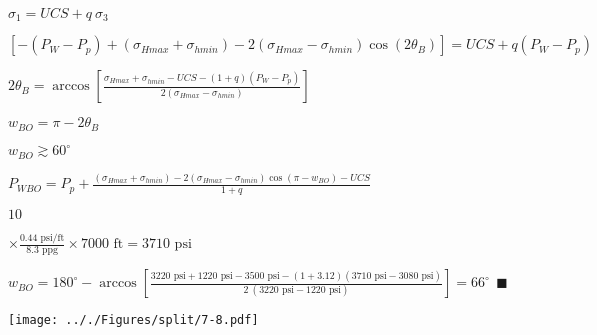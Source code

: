\documentclass[onecolumn,11pt]{report}
\def\lthtmlcheckvsize{\ifdim\ht\sizebox<\vsize 
  \ifdim\wd\sizebox<\hsize\expandafter\hfill\fi \expandafter\vfill
  \else\expandafter\vss\fi}%
\begin{document}
{\newpage\clearpage
{}%
$ \sigma_1 = UCS + q \: \sigma_3$%
\lthtmlindisplaymathZ
\lthtmlcheckvsize\clearpage}

{\newpage\clearpage
{}%
$\displaystyle \left[ -(P_W - P_p) + (\sigma_{Hmax} + \sigma_{hmin})
- 2(\sigma_{Hmax} - \sigma_{hmin}) \cos (2 \theta_B) \right]
= UCS + q (P_W - P_p)$%
\lthtmlindisplaymathZ
\lthtmlcheckvsize\clearpage}

{\newpage\clearpage
{}%
$\displaystyle 2 \theta_B = \arccos \left[ \frac{ \sigma_{Hmax} + \sigma_{hmin} - UCS - (1+q)(P_W - P_p)}{2(\sigma_{Hmax} - \sigma_{hmin})} \right]$%
\lthtmlindisplaymathZ
\lthtmlcheckvsize\clearpage}

{\newpage\clearpage
{}%
$\displaystyle w_{BO} = \pi - 2 \theta_B$%
\lthtmlindisplaymathZ
\lthtmlcheckvsize\clearpage}

{\newpage\clearpage
{}%
$ w_{BO} \gtrsim 60^{\circ}$%
\lthtmlindisplaymathZ
\lthtmlcheckvsize\clearpage}

{\newpage\clearpage
{}%
$\displaystyle P_{WBO} = P_p + \frac{ (\sigma_{Hmax} + \sigma_{hmin})
- 2(\sigma_{Hmax} - \sigma_{hmin}) \cos (\pi - w_{BO}) - UCS}{1+q}$%
\lthtmlindisplaymathZ
\lthtmlcheckvsize\clearpage}

{\newpage\clearpage
{}%
$\displaystyle 10$%
\lthtmlindisplaymathZ
\lthtmlcheckvsize\clearpage}

{\newpage\clearpage
{}%
$\displaystyle \times
\frac{0.44 \text{ psi/ft}} {8.3 \text{ ppg}} \times
7000 \text{ ft} = 3710 \text{ psi}
$%
\lthtmlindisplaymathZ
\lthtmlcheckvsize\clearpage}

{\newpage\clearpage
{}%
$\displaystyle w_{BO} = 180^{\circ} - \arccos \left[ \frac{ 3220 \text{ psi} + 1220 \text{ psi} - 3500 \text{ psi} - (1+3.12)(3710 \text{ psi} - 3080 \text{ psi})}{2 \: (3220 \text{ psi} - 1220 \text{ psi})} \right] = 66 ^{\circ} \: \: \blacksquare
$%
\lthtmlindisplaymathZ
\lthtmlcheckvsize\clearpage}

{\newpage\clearpage
{}%
\texttt{[image: .././Figures/split/7-8.pdf]}%
\lthtmlpictureZ
\lthtmlcheckvsize\clearpage}
\end{document}
